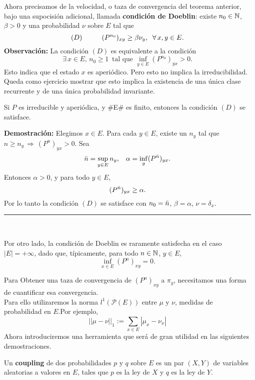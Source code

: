 Ahora precisamos de la velocidad, o taza de convergencia del teorema anterior, bajo una supocisión adicional, llamada \textbf{condición de Doeblin}: existe $n_0\in \mathbb N$, $\beta>0$ y una probabilidad $\nu$ sobre $E$ tal que
\[(D)\hspace{1cm}(P^{n_0})_{xy}\geq \beta\nu_y,\hspace{0.2cm}\forall\,x,y\in E.\]
\textbf{Observación:} La condición $(D)$ es equivalente a la condición
\[\exists\,x\in E,\,n_0\geq 1\,\text{ tal que }\inf_{y\in E}(P^{n_0})_{yx} > 0.\]
Esto indica que el estado $x$ es aperiódico. Pero esto no implica la irreducibilidad. Queda como ejercicio mostrar que esto implica la existencia de una única clase recurrente y de una única probabilidad invariante.

\begin{lem}
Si $P$ es irreducible y aperiódica, y #E# es finito, entonces la condición $(D)$ se satisface.
\end{lem}

\textbf{Demostración: }Elegimos $x\in E$. Para cada $y\in E$, existe un $n_y$ tal que $n\geq n_y\,\Longrightarrow\, (P^n)_{yx}>0$. Sea
\[\Bar{n} = \sup_{y\in E}n_y,\hspace{0.3cm}\alpha = \inf_y (P^{\Bar{n}})_{yx}.\]
Entonces $\alpha >0$, y para todo $y\in E$,
\[(P^{\Bar{n}})_{yx}\geq \alpha.\]
Por lo tanto la condición $(D)$ se satisface con $n_0 = \Bar{n}$, $\beta=\alpha$, $\nu = \delta_x$.\\
\rule{0.7em}{0.7em}\\ \newline

Por otro lado, la condición de Doeblin es raramente satisfecha en el caso $|E| = +\infty$, dado que, típicamente, para todo $n\in \mathbb N$, $y\in E$,
\[\inf_{x\in E}(P^n)_{xy} = 0.\]

Para Obtener una taza de convergencia de $(P^n)_{xy}$ a $\pi_y$, necesitamos una forma de cuantificar esa convergencia.\\ Para ello utilizaremos la norma $l^1(\mathcal{P}(E))$ entre $\mu$ y $\nu$, medidas de probabilidad en $E$.\newline Por ejemplo,
\[||\mu-\nu ||_1 := \sum_{x\in E}|\mu_x - \nu_x|\]
Ahora introduciremos una herramienta que será de gran utilidad en las siguientes demostraciones.
\begin{definicion}
Un \textbf{coupling} de dos probabilidades $p$ y $q$ sobre $E$ es un par $(X,Y)$ de variables aleatorias a valores en $E$, tales que $p$ es la ley de $X$ y $q$ es la ley de $Y$.
\end{definicion}


